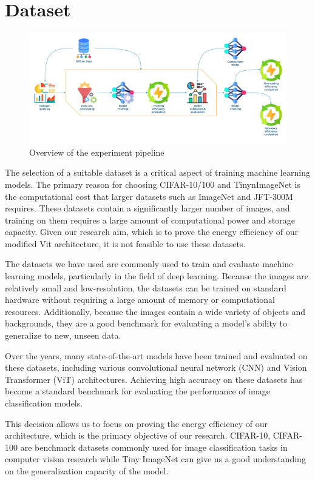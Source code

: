 \section{Dataset}
\label{dataset}
\begin{figure}[!h]
  \includegraphics[width=\textwidth]{images/icon_pipeline.pdf}
  \caption{Overview of the experiment pipeline}
  \label{pipeline}
\end{figure}
The selection of a suitable dataset is a critical aspect of training machine learning models. The primary reason for choosing CIFAR-10/100 and TinynImageNet is the computational cost that larger datasets such as ImageNet and JFT-300M requires. These datasets contain a significantly larger number of images, and training on them requires a large amount of computational power and storage capacity. Given our research aim, which is to prove the energy efficiency of our modified Vit architecture, it is not feasible to use these datasets.

The datasets we have used are commonly used to train and evaluate machine learning models, particularly in the field of deep learning. Because the images are relatively small and low-resolution, the datasets can be trained on standard hardware without requiring a large amount of memory or computational resources. Additionally, because the images contain a wide variety of objects and backgrounds, they are a good benchmark for evaluating a model's ability to generalize to new, unseen data.

Over the years, many state-of-the-art models have been trained and evaluated on these datasets, including various convolutional neural network (CNN) and Vision Transformer (ViT) architectures. Achieving high accuracy on these datasets has become a standard benchmark for evaluating the performance of image classification models.

This decision allows us to focus on proving the energy efficiency of our architecture, which is the primary objective of our research.
CIFAR-10, CIFAR-100 are benchmark datasets commonly used for image classification tasks in computer vision research while Tiny ImageNet can give us a good understanding on the generalization capacity of the model. 

